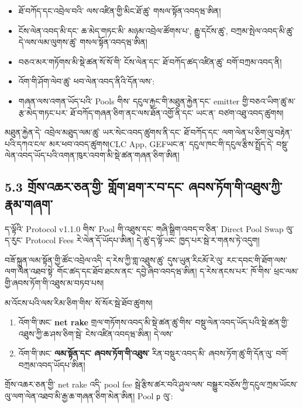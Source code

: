 \documentclass[11pt]{article}
\begin{document}
\begin{itemize}[leftmargin=*]
\item ཐོ་བཀོད་དང་འབྲེལ་བའི་ ལས་འཛིན་གྱི་མིང་ཐོ་ཚུ་ གསལ་སྟོན་འབདཝ་ཨིན།
\item ངོས་ལེན་འབད་མི་དང་ ཆ་མེད་གཏང་མི་ མཉམ་འབྲེལ་ཚོགས་པ་, རྒྱུ་དངོས་ཚུ་, བཀྲམ་སྤེལ་འབད་མི་ཚུ་ དེ་ལས་ལམ་ལུགས་ཚུ་ གསལ་སྟོན་འབདཝ་ཨིན།
\item བཅའ་མར་གཏོགས་མི་སྡེ་ཚན་སོ་སོ་གི་ ངོས་ལེན་དང་ ཐོ་བཀོད་ཚད་འཛིན་ཚུ་ བགོ་བཀྲམ་འབད་ནི།
\item འོག་གི་ཤོག་ལེབ་ཚུ་ ཕབ་ལེན་འབད་ནིའི་དོན་ལས་:
\item གཞན་ལས་འགན་ཡོད་པའི་ Pools གིས་ དངུལ་རྐྱང་གི་མཐུན་རྐྱེན་དང་ emitter གྱི་བཅའ་ཡིག་ཚུ་མ་རྩ་མེད་གཏང་པར་ ཐོ་བཀོད་གཞན་ཅིག་ནང་ལས་ཐོན་འགྱོ་ནི་དང་ ཡང་ན་ བཙག་འཐུ་འབད་ཚུགས།
\end{itemize}
མཐུན་རྐྱེན་དེ་ འབྲེལ་མཐུད་ལམ་ཚུ་ ཡར་སེང་འབད་ཚུགས་ནི་དང་ ཐོ་བཀོད་དང་ ལག་ལེན་པ་ཅིག་ལུ་བརྟེན་པའི་དཀའ་ངལ་ མར་ཕབ་འབད་ཚུགས།CLC App, GEFཡང་ན་ དངུལ་ཁང་གི་དངུལ་རྩིས་སྤྲོད་དེ་ བསྡུ་ལེན་འབད་ཡོད་པའི་འགན་ཁུར་འབག་མི་སྡེ་ཚན་གཞན་ཅིག་ཨིན།

\subsection*{5.3 གྲོས་འཆར་ཅན་གྱི་ གློག་ཐག་ར་བ་དང་ ཞབས་ཏོག་གི་འཐུས་ཀྱི་རྣམ་གཞག་}

ད་ལྟོའི་ Protocol v1.1.0 གིས་ Pool གི་འཐུས་དང་ གཞི་སྒྲིག་འབད་བ་ཅིན་ Direct Pool Swap ལུ་ ད་རུང་ Protocol Fees རེ་ལེན་དོ་ཡོདཔ་ཨིན། དེ་ཚུ་ད་ལྟོ་ཡང་ ཁྱད་པར་སྦེ་ར་གནས་ཏེ་འདུག།

བཟོ་སྐྲུན་ལམ་སྟོན་གྱི་ཚོང་འབྲེལ་འདི་ ད་རེས་ཀྱི་གླ་འཐུས་ཚུ་ དུས་ཡུན་རིངམོ་རེ་ལུ་ རང་དབང་གི་ཐོག་ལས་ལག་ལེན་འཐབ་སྟེ་ གོང་ཚད་དང་ཐོབ་ཐངས་ནང་ དབྱེ་ཞིབ་འབདཝ་ཨིན། ད་རེས་ནངས་པར་ ཁོ་གིས་ ཕྲང་ལམ་གྱི་ཞབས་ཏོག་གི་འཐུས་མ་བཏབ་པས།

མ་འོངས་པའི་ལས་རིམ་ཅིག་གིས་ སོ་སོར་སྦེ་ཐོབ་ཚུགས།

\begin{enumerate}[leftmargin=*]
\item འོག་གི་ཨང་ \textbf{net rake} གྲལ་གཏོགས་འབད་མི་སྡེ་ཚན་ཚུ་གིས་ བསྡུ་ལེན་འབད་ཡོད་པའི་སྡེ་ཚན་གྱི་འཐུས་ཀྱི་ཆ་ཤས་ཅིག་སྦེ་ ངེས་འཛིན་འབདཝ་ཨིན། དེ་ལས་
\item འོག་གི་ཨང་ \textbf{ལམ་སྟོན་དང་ ཞབས་ཏོག་གི་འཐུས་} རིན་བསྡུར་འབད་མི་ ཞབས་ཏོག་ཚུ་གི་དོན་ལུ་ བགོ་བཀྲམ་འབད་ཡོདཔ་ཨིན།
\end{enumerate}
གྲོས་འཆར་ཅན་གྱི་ net rake འདི་ pool fee སྦེ་རྩིས་ཚར་བའི་ཤུལ་ལས་ བསྒྱུར་བཅོས་ཀྱི་དངུལ་ཀྲམ་ཡོངས་ལུ་ལག་ལེན་འཐབ་མི་རྒྱ་ཆ་གཞན་ཅིག་མེན་ཨིན། Pool \texttt{p} ལུ་:
\end{document}
